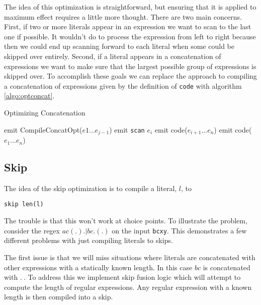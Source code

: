 The idea of this optimization is straightforward, but ensuring that
it is applied to maximum effect requires a little more thought. There
are two main concerns. First, if two or more literals appear in an
expression we want to scan to the last one if possible. It wouldn't
do to process the expression from left to right because then we could
end up scanning forward to each literal when some could be skipped over
entirely. Second, if a literal appears in a concatenation of expressions
we want to make sure that the largest possible group of expressions
is skipped over. To accomplish these goals we can replace the approach
to compiling a concatenation of expressions given by the definition of
\verb'code' with algorithm \ref{algo:optconcat}.

\begin{algorithm}
\caption{Optimizing Concatenation} \label{algo:optconcat}
\begin{algorithmic}
          \State emit CompileConcatOpt($e1 ... e_{j-1}$)
          \State emit \verb'scan' $e_i$
          \State emit code($e_{i+1} ... e_n$)
        \EndIf
      \EndFor
    \EndIf
  \EndFor
    emit code($e_1 ... e_n$)
  \EndIf
\EndProcedure
\end{algorithmic}
\end{algorithm}

\subsection{Skip}

The idea of the skip optimization is to compile a literal, $l$, to

\begin{verbatim}
skip len(l)
\end{verbatim}

The trouble is that this won't work at choice points. To illustrate the
problem, consider the regex $ac(.). \rvert bc.(.)$ on the input
\verb'bcxy'. This demonstrates a few different problems with just
compiling literals to skips.

The first issue is that we will miss situations where literals are
concatenated with other expressions with a statically known length.
In this case $bc$ is concatenated with $. \:$. To address this
we implement skip fusion logic which will attempt to compute the
length of regular expressions. Any regular expression with a
known length is then compiled into a skip.

